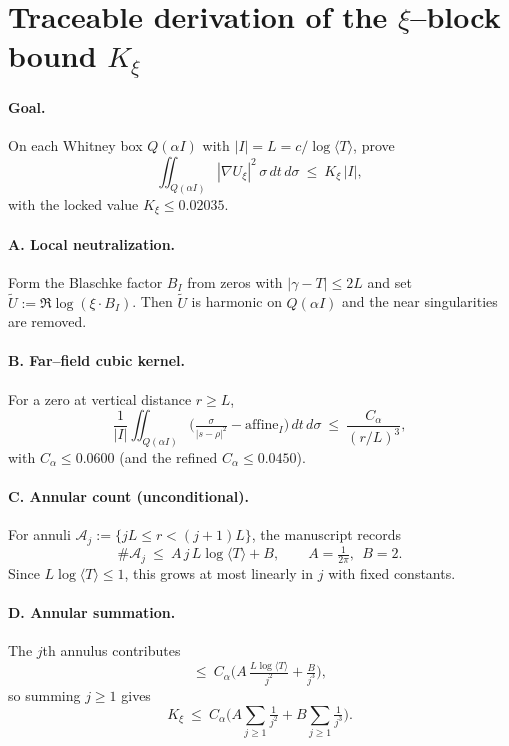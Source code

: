 
\section*{Traceable derivation of the $\xi$--block bound $K_{\xi}$}

\paragraph{Goal.} On each Whitney box $Q(\alpha I)$ with $|I|=L=c/\log\langle T\rangle$, prove
\[ \iint_{Q(\alpha I)} |\nabla U_{\xi}|^2\,\sigma\,dt\,d\sigma\ \le\ K_{\xi}\,|I|, \]
with the locked value $K_{\xi}\le 0.02035$.

\paragraph{A. Local neutralization.} Form the Blaschke factor $B_I$ from zeros with $|\gamma-T|\le 2L$ and set $\widetilde U:=\Re\log(\xi\cdot B_I)$. Then $\widetilde U$ is harmonic on $Q(\alpha I)$ and the near singularities are removed.

\paragraph{B. Far–field cubic kernel.} For a zero at vertical distance $r\ge L$,
\[ \frac{1}{|I|}\iint_{Q(\alpha I)}\Big(\tfrac{\sigma}{|s-\rho|^2}-\mathrm{affine}_I\Big)\,dt\,d\sigma\ \le\ \frac{C_\alpha}{(r/L)^3},\]
with $C_\alpha\le 0.0600$ (and the refined $C_\alpha\le 0.0450$).

\paragraph{C. Annular count (unconditional).} For annuli $\mathcal A_j:=\{jL\le r<(j+1)L\}$, the manuscript records
\[ \#\mathcal A_j\ \le\ A\,j\,L\log\langle T\rangle + B,\qquad A=\tfrac{1}{2\pi},\ \ B=2. \]
Since $L\log\langle T\rangle\le 1$, this grows at most linearly in $j$ with fixed constants.

\paragraph{D. Annular summation.} The $j$th annulus contributes
\[ \le\ C_\alpha\Big( A\,\tfrac{L\log\langle T\rangle}{j^2} + \tfrac{B}{j^3}\Big), \]
so summing $j\ge1$ gives
\[ K_{\xi}\ \le\ C_\alpha\Big( A\sum_{j\ge1}\tfrac{1}{j^2} + B\sum_{j\ge1}\tfrac{1}{j^3}\Big). \]

